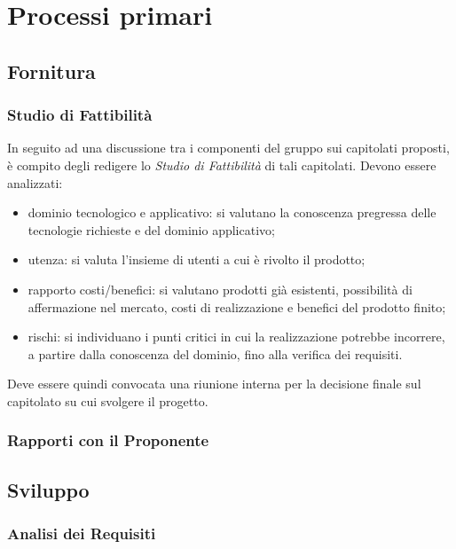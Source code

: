 \section{Processi primari}

\subsection{Fornitura}
\subsubsection{Studio di Fattibilità}
In seguito ad una discussione tra i componenti del gruppo sui capitolati proposti, è compito degli \Analisti{} redigere lo \textit{Studio di Fattibilità} di tali capitolati. Devono essere analizzati:
\begin{itemize}
	\item dominio tecnologico e applicativo: si valutano la conoscenza pregressa delle tecnologie richieste e del dominio applicativo;
	\item utenza: si valuta l'insieme di utenti a cui è rivolto il prodotto;
	\item rapporto costi/benefici: si valutano prodotti già esistenti, possibilità di affermazione nel mercato, costi di realizzazione e benefici del prodotto finito;
	\item rischi: si individuano i punti critici in cui la realizzazione potrebbe incorrere, a partire dalla conoscenza del dominio, fino alla verifica dei requisiti.
\end{itemize}
Deve essere quindi convocata una riunione interna per la decisione finale sul capitolato su cui svolgere il progetto.

\subsubsection{Rapporti con il Proponente}

\subsection{Sviluppo}

\subsubsection{Analisi dei Requisiti}

